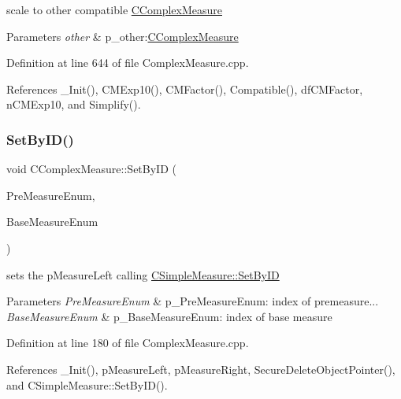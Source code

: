 scale to other compatible \hyperlink{classCComplexMeasure}{C\+Complex\+Measure} 


\begin{DoxyParams}{Parameters}
{\em other} & p\+\_\+other\+:\hyperlink{classCComplexMeasure}{C\+Complex\+Measure} \\
\hline
\end{DoxyParams}


Definition at line 644 of file Complex\+Measure.\+cpp.



References \+\_\+\+Init(), C\+M\+Exp10(), C\+M\+Factor(), Compatible(), df\+C\+M\+Factor, n\+C\+M\+Exp10, and Simplify().

\mbox{\label{classCComplexMeasure_a47dca89bc28bbb257f81df4d363be623}} 
\subsubsection{\texorpdfstring{Set\+By\+I\+D()}{SetByID()}}
{\footnotesize\ttfamily void C\+Complex\+Measure\+::\+Set\+By\+ID (\begin{DoxyParamCaption}\item[{const \hyperlink{PreMeasure_8h_a6c81167b8d4c2badde42f81cb7214620}{e\+Pre\+Measure}}]{Pre\+Measure\+Enum,  }\item[{const \hyperlink{BaseMeasure_8h_ac90e5164ccf1f0d648fba7e94b229a11}{e\+Base\+Measure}}]{Base\+Measure\+Enum }\end{DoxyParamCaption})}



sets the p\+Measure\+Left calling \hyperlink{classCSimpleMeasure_a6945aa333dca5623482d38cd9a7e3225}{C\+Simple\+Measure\+::\+Set\+By\+ID} 


\begin{DoxyParams}{Parameters}
{\em Pre\+Measure\+Enum} & p\+\_\+\+Pre\+Measure\+Enum\+: index of premeasure... \\
\hline
{\em Base\+Measure\+Enum} & p\+\_\+\+Base\+Measure\+Enum\+: index of base measure \\
\hline
\end{DoxyParams}


Definition at line 180 of file Complex\+Measure.\+cpp.



References \+\_\+\+Init(), p\+Measure\+Left, p\+Measure\+Right, Secure\+Delete\+Object\+Pointer(), and C\+Simple\+Measure\+::\+Set\+By\+I\+D().


